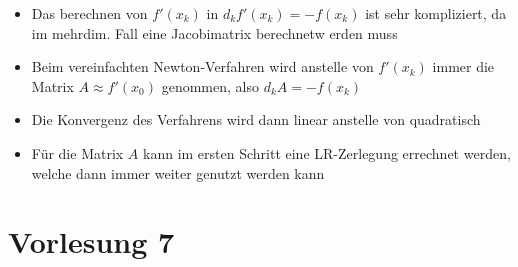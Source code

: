 \documentclass[]{article}
\begin{document}
\begin{enumerate}
			\begin{itemize}
				\item Das berechnen von $f'(x_k)$ in $d_k f'(x_k) = -f(x_k)$ ist sehr kompliziert, da im mehrdim. Fall eine Jacobimatrix berechnetw erden muss
				\item Beim vereinfachten Newton-Verfahren wird anstelle von $f'(x_k)$ immer die Matrix $A \approx f'(x_0)$ genommen, also $d_k A = -f(x_k)$
				\item Die Konvergenz des Verfahrens wird dann linear anstelle von quadratisch
				\item Für die Matrix $A$ kann im ersten Schritt eine LR-Zerlegung errechnet werden, welche dann immer weiter genutzt werden kann
			\end{itemize}	
	\end{enumerate}

\section{Vorlesung 7}
\end{document}
